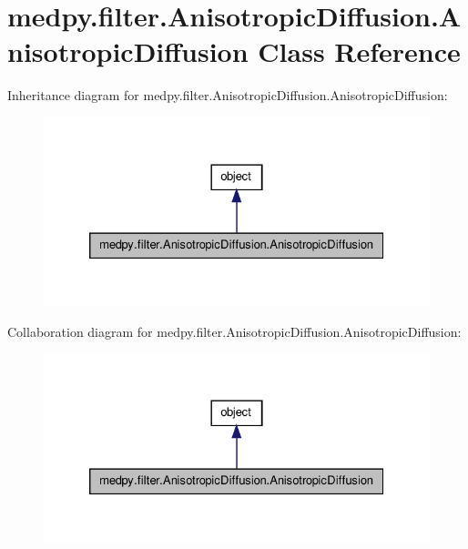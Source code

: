 \hypertarget{classmedpy_1_1filter_1_1AnisotropicDiffusion_1_1AnisotropicDiffusion}{
\section{medpy.filter.AnisotropicDiffusion.AnisotropicDiffusion Class Reference}
\label{classmedpy_1_1filter_1_1AnisotropicDiffusion_1_1AnisotropicDiffusion}
}


Inheritance diagram for medpy.filter.AnisotropicDiffusion.AnisotropicDiffusion:\nopagebreak
\begin{figure}[H]
\begin{center}
\leavevmode
\includegraphics[width=328pt]{classmedpy_1_1filter_1_1AnisotropicDiffusion_1_1AnisotropicDiffusion__inherit__graph}
\end{center}
\end{figure}


Collaboration diagram for medpy.filter.AnisotropicDiffusion.AnisotropicDiffusion:\nopagebreak
\begin{figure}[H]
\begin{center}
\leavevmode
\includegraphics[width=328pt]{classmedpy_1_1filter_1_1AnisotropicDiffusion_1_1AnisotropicDiffusion__coll__graph}
\end{center}
\end{figure}
